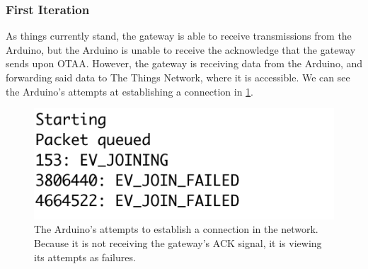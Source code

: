 \subsubsection{First Iteration}
As things currently stand, the gateway is able to receive transmissions from the Arduino, but the Arduino is unable to receive the acknowledge that the gateway sends upon OTAA.
However, the gateway is receiving data from the Arduino, and forwarding said data to The Things Network, where it is accessible.
We can see the Arduino's attempts at establishing a connection in \cref{fig:gateway_serial}.
\begin{figure}[ht]
  \centering
  \includegraphics{figure/gateway_serial}
  \caption{The Arduino's attempts to establish a connection in the network.  Because it is not receiving the gateway's ACK signal, it is viewing its attempts as failures.}
  \label{fig:gateway_serial}
\end{figure}

